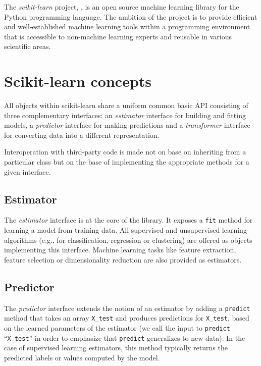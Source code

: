 \documentclass{frontiersSCNS} %
\begin{document}
The {\em scikit-learn} project, \cite{pedregosa2011}, is an open source machine
learning library for the Python programming language. The ambition of the
project is to provide efficient and well-established machine learning tools within
a programming environment that is accessible to non-machine learning experts
and reusable in various scientific areas.




\section{Scikit-learn concepts}


All objects within scikit-learn share a uniform common basic API consisting of three
complementary interfaces: an \textit{estimator} interface for building and
fitting models, a \textit{predictor} interface for making predictions and a
\textit{transformer} interface for converting data into a different representation.

Interoperation with third-party code is made not on base on inheriting from a
particular class but on the base of implementing the appropriate methods for a
given interface.

\subsection{Estimator}

The \textit{estimator} interface is at the core of the library. It exposes a
\texttt{fit} method for learning a model from training data.  All supervised
and unsupervised learning algorithms (e.g., for classification, regression or
clustering) are offered as objects implementing this interface. Machine
learning tasks like feature extraction, feature selection or dimensionality
reduction are also provided as estimators.

\subsection{Predictor}

The \textit{predictor} interface extends the notion of an estimator
by adding a \texttt{predict}
method that takes an array \texttt{X\_test} and produces
predictions for \texttt{X\_test}, based on the learned parameters of the
estimator (we call the input to \texttt{predict} ``\texttt{X\_test}'' in order
to emphasize that \texttt{predict} generalizes to new data). In the case of
supervised learning estimators, this method typically returns the predicted
labels or values computed by the model.
\end{document}
